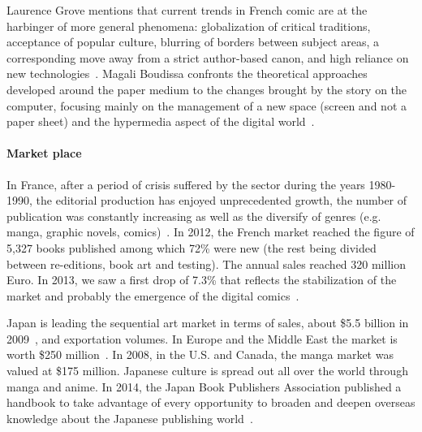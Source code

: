 
Laurence Grove mentions that current trends in French comic are at the harbinger of more general phenomena: globalization of critical traditions, acceptance of popular culture, blurring of borders between subject areas, a corresponding move away from a strict author-based canon, and high reliance on new technologies~\cite{Grove2014Bande}.
Magali Boudissa confronts the theoretical approaches developed around the paper medium to the changes brought by the story on the computer, focusing mainly on the management of a new space (screen and not a paper sheet) and the hypermedia aspect of the digital world~\cite{Boudissa2011Bande}.

\paragraph{Market place} %

In France, after a period of crisis suffered by the sector during the years 1980-1990, the editorial production has enjoyed unprecedented growth, the number of publication was constantly increasing as well as the diversify of genres (e.g. manga, graphic novels, comics)~\cite{Evans2012Lecture}.
In 2012, the French market reached the figure of 5,327 books published among which 72\% were new (the rest being divided between re-editions, book art and testing).
The annual sales reached 320 million Euro.
In 2013, we saw a first drop of 7.3\% that reflects the stabilization of the market and probably the emergence of the digital comics~\cite{Ratier2013Deceleration}.

Japan is leading the sequential art market in terms of sales, about \$5.5 billion in 2009~\cite{Syed2012}, and exportation volumes.
In Europe and the Middle East the market is worth \$250 million~\cite{Davidson2012}.
In 2008, in the U.S. and Canada, the manga market was valued at \$175 million.
Japanese culture is spread out all over the world through manga and anime.
In 2014, the Japan Book Publishers Association published a handbook to take advantage of every opportunity to broaden and deepen overseas knowledge about the Japanese publishing world~\cite{JBPA2014}.

